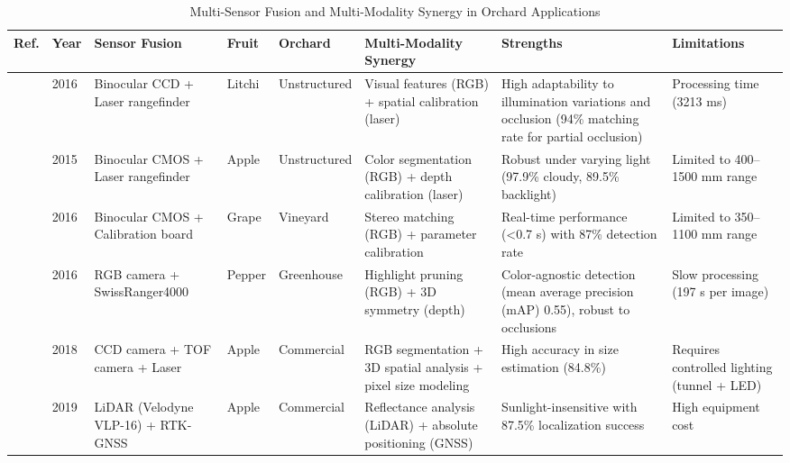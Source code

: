 \documentclass[a4paper,fleqn]{cas-dc}
\begin{document}
\begin{table}[ht]
\small
\centering
\caption{Multi-Sensor Fusion and Multi-Modality Synergy in Orchard Applications} 
\label{tab:dataset}
\begin{tabular}{p{}p{}p{}p{}p{}p{}p{}p{}}
\hline
\textbf{Ref.} & \textbf{Year} & \textbf{Sensor Fusion} & \textbf{Fruit} & \textbf{Orchard} & \textbf{Multi-Modality Synergy} & \textbf{Strengths} & \textbf{Limitations} \\ 
\hline
\cite{wang2016localisation} & 2016 & Binocular CCD + Laser rangefinder & Litchi & Unstructured & Visual features (RGB) + spatial calibration (laser) & High adaptability to illumination variations and occlusion (94\% matching rate for partial occlusion) & Processing time (3213 ms) \\ 
\hline
\cite{si2015location} & 2015 & Binocular CMOS + Laser rangefinder & Apple & Unstructured & Color segmentation (RGB) + depth calibration (laser) & Robust under varying light (97.9\% cloudy, 89.5\% backlight) & Limited to 400–1500 mm range  \\ 
\hline
\cite{luo2016vision} & 2016 & Binocular CMOS + Calibration board & Grape & Vineyard & Stereo matching (RGB) + parameter calibration & Real-time performance (<0.7 s) with 87\% detection rate & Limited to 350–1100 mm range  \\ 
\hline
\cite{barnea2016colour} & 2016 & RGB camera + SwissRanger4000 & Pepper & Greenhouse & Highlight pruning (RGB) + 3D symmetry (depth) & Color-agnostic detection (mean average precision (mAP) 0.55), robust to occlusions & Slow processing (197 s per image)  \\ 
\hline
\cite{gongal2018apple} & 2018 & CCD camera + TOF camera + Laser & Apple & Commercial & RGB segmentation + 3D spatial analysis + pixel size modeling & High accuracy in size estimation (84.8\%) & Requires controlled lighting (tunnel + LED) \\ 
\hline
\cite{gene2019fruit} & 2019 & LiDAR (Velodyne VLP-16) + RTK-GNSS & Apple & Commercial & Reflectance analysis (LiDAR) + absolute positioning (GNSS) & Sunlight-insensitive with 87.5\% localization success & High equipment cost  \\ 

\end{tabular}
\end{table}
\end{document}
